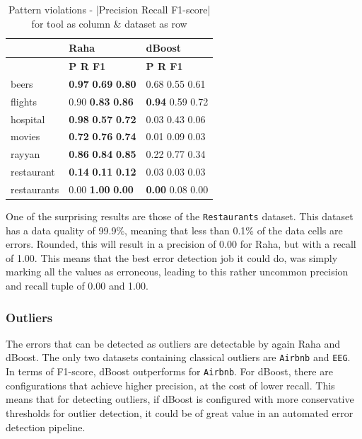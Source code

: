 \begin{table}[H]
\centering
\caption{Pattern violations - |Precision Recall F1-score| for tool as column \& dataset as row}
\begin{adjustbox}{center}
\begin{tabular}{lll}
\toprule
{} & Raha & dBoost \\
\midrule
 & \textbf{\space\space\space P \space\space\space\space R \space\space\space F1} & \textbf{\space\space\space P \space\space\space\space R \space\space\space F1} \\
beers & \textbf{0.97} \textbf{0.69} \textbf{0.80} & 0.68 0.55 0.61 \\
flights & 0.90 \textbf{0.83} \textbf{0.86} & \textbf{0.94} 0.59 0.72 \\
hospital & \textbf{0.98} \textbf{0.57} \textbf{0.72} & 0.03 0.43 0.06 \\
movies & \textbf{0.72} \textbf{0.76} \textbf{0.74} & 0.01 0.09 0.03 \\
rayyan & \textbf{0.86} \textbf{0.84} \textbf{0.85} & 0.22 0.77 0.34 \\
restaurant & \textbf{0.14} \textbf{0.11} \textbf{0.12} & 0.03 0.03 0.03 \\
restaurants & 0.00 \textbf{1.00} \textbf{0.00} & \textbf{0.00} 0.08 0.00 \\
\bottomrule
\end{tabular}
\end{adjustbox}
\end{table}

One of the surprising results are those of the \verb|Restaurants| dataset. This dataset has a data quality of 99.9\%, meaning that less than 0.1\% of the data cells are errors. Rounded, this will result in a precision of 0.00 for Raha, but with a recall of 1.00. This means that the best error detection job it could do, was simply marking all the values as erroneous, leading to this rather uncommon precision and recall tuple of 0.00 and 1.00. 

\subsubsection{Outliers}
The errors that can be detected as outliers are detectable by again Raha and dBoost. The only two datasets containing classical outliers are \verb|Airbnb| and \verb|EEG|. In terms of F1-score, dBoost outperforms for \verb|Airbnb|. For dBoost, there are configurations that achieve higher precision, at the cost of lower recall. This means that for detecting outliers, if dBoost is configured with more conservative thresholds for outlier detection, it could be of great value in an automated error detection pipeline. 

